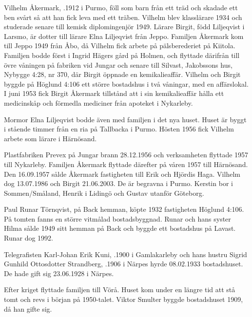 Vilhelm Åkermark, .1912 i Purmo, föll som barn från ett träd och skadade ett ben svårt så att han fick leva med ett träben. Vilhelm blev klasslärare 1934 och studerade senare till kemisk diplomingenjör 1949. 	Lärare Birgit, född Liljeqvist i Larsmo, är dotter till lärare Elna Liljeqvist från Jeppo. Familjen Åkermark kom till Jeppo 1949 från Åbo, då Vilhelm	fick arbete på pälsberederiet på Kiitola. Familjen bodde först i Ingrid Hägers gård på Holmen, och flyttade därifrån till övre våningen på fabriken vid Jungar och senare till Silvast, Jakobssons hus, Nybygge 4:28, nr 370, där Birgit öppnade en kemikalieaffär. Vilhelm och Birgit byggde på Höglund 4:106 ett större bostadshus i två våningar, med en 	affärslokal. I juni 1953 fick Birgit Åkermark tillstånd att i sin kemikalieaffär hålla ett medicinskåp och förmedla mediciner från apoteket i Nykarleby.
\begin{jhchildren}
  \item {}
  \item {}
  \item {}
\end{jhchildren}
Mormor Elna Liljeqvist bodde även med familjen i det nya huset. Huset är byggt i stående timmer från en ria på Tallbacka i Purmo. Hösten 1956 fick Vilhelm arbete som lärare i Härnösand.

Plastfabriken Prevex på Jungar brann 28.12.1956 och verksamheten flyttade 1957 till Nykarleby. Familjen Åkermark flyttade därefter på våren 1957 till Härnösand. Den 16.09.1957 sålde Åkermark fastigheten till Erik och Hjördis Haga. Vilhelm dog 13.07.1986 och Birgit 21.06.2003. De är begravna i Purmo. Kerstin bor i Sommen/Småland, Henrik i Lidingö och Gustav utanför Göteborg.


Paul Runar Törnqvist,  på Back hemman, köpte 1932 fastigheten Höglund 4:106. På tomten fanns en större vitmålad bostadsbyggnad. Runar och hans syster Hilma sålde 1949 sitt hemman på Back och byggde ett bostadshus på Lavast. Runar dog 1992.

Telegrafisten Karl-Johan Erik Kuni, .1900 i Gamlakarleby och hans hustru Sigrid Gunhild Ottosdotter Strandberg, .1906 i Närpes hyrde 08.02.1933 bostadshuset. De hade gift sig 23.06.1928 i Närpes.
\begin{jhchildren}
  \item {}
  \item {}
\end{jhchildren}
Efter kriget flyttade familjen till Vörå. Huset kom under en längre tid	att stå tomt och revs i början på 1950-talet. Viktor Smulter byggde	bostadshuset 1909, då han gifte sig.



